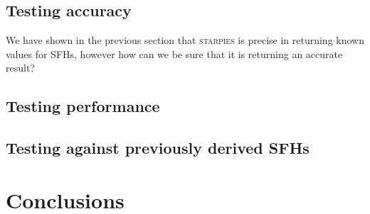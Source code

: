 \documentclass[useAMS,usenatbib]{mn2e}
\begin{document}
\subsection{Testing accuracy}

We have shown in the previous section that \textsc{starpies} is precise in returning known values for SFHs, however how can we be sure that it is returning an accurate result? 

\subsection{Testing performance}

\subsection{Testing against previously derived SFHs}

\section{Conclusions}


  
\end{document}
